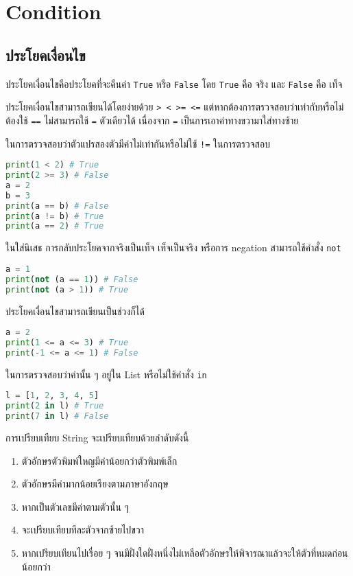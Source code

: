 \section{Condition}

\subsection{ประโยคเงื่อนไข}

ประโยคเงื่อนไขคือประโยคที่จะคืนค่า \verb|True| หรือ \verb|False| โดย \verb|True| คือ จริง และ \verb|False| คือ เท็จ

ประโยคเงื่อนไขสามารถเขียนได้โดยง่ายด้วย \verb|> < >= <=| แต่หากต้องการตรวจสอบว่าเท่ากับหรือไม่ต้องใช้ \verb|==| ไม่สามารถใช้ \verb|=| ตัวเดียวได้ เนื่องจาก \verb|=| เป็นการเอาค่าทางขวามาใส่ทางซ้าย

ในการตรวจสอบว่าตัวแปรสองตัวมีค่าไม่เท่ากันหรือไม่ใช้ \verb|!=| ในการตรวจสอบ

\begin{lstlisting}[language=Python]
print(1 < 2) # True
print(2 >= 3) # False
a = 2
b = 3
print(a == b) # False
print(a != b) # True
print(a == 2) # True
\end{lstlisting}

ในใส่นิเสธ การกลับประโยคจากจริงเป็นเท็จ เท็จเป็นจริง หรือการ negation สามารถใช้คำสั่ง \verb|not|

\begin{lstlisting}[language=Python]
a = 1
print(not (a == 1)) # False
print(not (a > 1)) # True
\end{lstlisting}

ประโยคเงื่อนไขสามารถเขียนเป็นช่วงก็ได้

\begin{lstlisting}[language=Python]
a = 2
print(1 <= a <= 3) # True
print(-1 <= a <= 1) # False
\end{lstlisting}

ในการตรวจสอบว่าค่านั้น ๆ อยู่ใน List หรือไม่ใช้คำสั่ง \verb|in|

\begin{lstlisting}[language=Python]
l = [1, 2, 3, 4, 5]
print(2 in l) # True
print(7 in l) # False
\end{lstlisting}

การเปรียบเทียบ String จะเปรียบเทียบด้วยลำดับดังนี้

\begin{enumerate}
    \item ตัวอักษรตัวพิมพ์ใหญมีค่าน้อยกว่าตัวพิมพ์เล็ก
    \item ตัวอักษรมีค่ามากน้อยเรียงตามภาษาอังกฤษ
    \item หากเป็นตัวเลขมีค่าตามตัวนั้น ๆ
    \item จะเปรียบเทียบทีละตัวจากซ้ายไปขวา
    \item หากเปรียบเทียนไปเรื่อย ๆ จนมีฝั่งใดฝั่งหนึ่งไม่เหลือตัวอักษรให้พิจารณาแล้วจะให้ตัวที่หมดก่อนน้อยกว่า
\end{enumerate}

